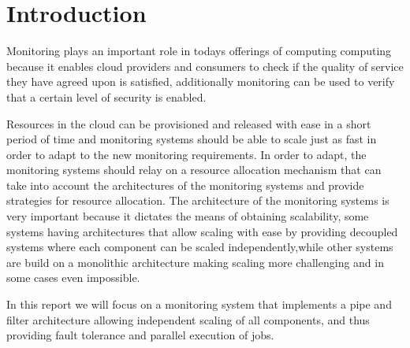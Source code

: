 \section*{Introduction}

Monitoring plays an important role in todays offerings of computing computing because it enables cloud providers and consumers to check if the quality of service they have agreed upon is satisfied, additionally monitoring can be used to verify that a certain level of security is enabled. 

Resources in the cloud can be provisioned and released with ease in a short period of time and monitoring systems should be able to scale just as fast in order to adapt to the new monitoring requirements. In order to adapt, the monitoring systems
should relay on a resource allocation mechanism that can take into account the architectures of the monitoring systems and provide strategies for resource allocation. The architecture of the monitoring systems is very important because it dictates the means of obtaining scalability, some systems having architectures that allow scaling with ease by providing decoupled systems where each component can be scaled independently,while other systems are build on a monolithic architecture making scaling more challenging and in some cases even impossible.

In this report we will focus on a monitoring system that implements a pipe and filter architecture allowing independent scaling of all components, and thus providing fault tolerance and parallel execution of jobs. 

